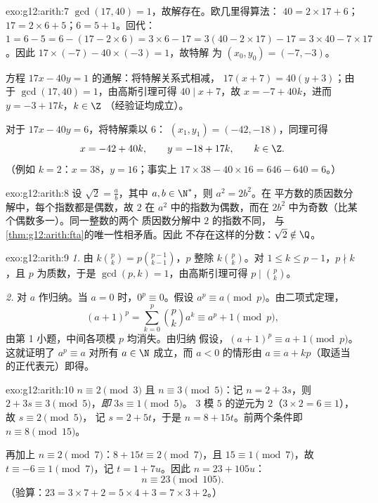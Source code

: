 \begin{solution}{exo:g12:arith:7}
$\gcd(17, 40) = 1$，故解存在。欧几里得算法：
$40 = 2\times17 + 6$；$17 = 2\times6 + 5$；$6 = 5 + 1$。回代：
$1 = 6 - 5 = 6 - (17 - 2\times6) = 3\times6 - 17
= 3(40 - 2\times17) - 17 = 3\times40 - 7\times17$。因此
$17\times(-7) - 40\times(-3) = 1$，故特解
为 $(x_0, y_0) = (-7, -3)$。

方程 $17x - 40y = 1$ 的通解：将特解关系式相减，
$17(x + 7) = 40(y + 3)$；由于 $\gcd(17, 40) = 1$，由高斯引理可得
$40 \mid x + 7$，故 $x = -7 + 40k$，进而 $y = -3 + 17k$，$k \in \Z$
（经验证均成立）。

对于 $17x - 40y = 6$，将特解乘以 $6$：
$(x_1, y_1) = (-42, -18)$，同理可得
\[
x = -42 + 40k, \qquad y = -18 + 17k, \qquad k \in \Z .
\]
（例如 $k = 2$：$x = 38$，$y = 16$；事实上 $17\times38 - 40\times16
= 646 - 640 = 6$。）
\end{solution}

\begin{solution}{exo:g12:arith:8}
设 $\sqrt2 = \frac ab$，其中 $a, b \in \N^*$，则 $a^2 = 2b^2$。在
平方数的质因数分解中，每个指数都是偶数，故
$2$ 在 $a^2$ 中的指数为偶数，而在 $2b^2$ 中为奇数（比某个偶数多一）。同一整数的两个
质因数分解中 $2$ 的指数不同，
与\cref{thm:g12:arith:fta}的唯一性相矛盾。因此
不存在这样的分数：$\sqrt2 \notin \Q$。
\end{solution}

\begin{solution}{exo:g12:arith:9}
\emph{1.} 由 $k\binom pk = p \binom{p-1}{k-1}$，$p$ 整除
$k\binom pk$。对 $1 \leq k \leq p-1$，$p \nmid k$，且 $p$ 为质数，于是
$\gcd(p, k) = 1$，由高斯引理可得 $p \mid \binom pk$。

\emph{2.} 对 $a$ 作归纳。当 $a = 0$ 时，$0^p \equiv 0$。假设
$a^p \equiv a \pmod p$。由二项式定理，
\[
(a+1)^p = \sum_{k=0}^{p} \binom pk a^k
\equiv a^p + 1 \pmod p,
\]
由第 1 小题，中间各项模 $p$ 均消失。由归纳
假设，$(a+1)^p \equiv a + 1 \pmod p$。这就证明了
$a^p \equiv a$ 对所有 $a \in \N$ 成立，而 $a < 0$ 的情形由
$a \equiv a + kp$（取适当的正代表元）即得。
\end{solution}

\begin{solution}{exo:g12:arith:10}
$n \equiv 2 \pmod 3$ 且 $n \equiv 3 \pmod 5$：记 $n = 2 + 3s$，则
$2 + 3s \equiv 3 \pmod 5$，\emph{即} $3s \equiv 1 \pmod 5$。
$3$ 模 $5$ 的逆元为 $2$（$3\times2 = 6 \equiv 1$），故 $s \equiv 2 \pmod 5$，
记 $s = 2 + 5t$，于是 $n = 8 + 15t$。前两个条件即
$n \equiv 8 \pmod{15}$。

再加上 $n \equiv 2 \pmod 7$：$8 + 15t \equiv 2 \pmod 7$，且
$15 \equiv 1 \pmod 7$，故 $t \equiv -6 \equiv 1 \pmod 7$，记
$t = 1 + 7u$。因此 $n = 23 + 105u$：
\[
n \equiv 23 \pmod{105}.
\]
（验算：$23 = 3\times7 + 2 = 5\times4 + 3 = 7\times3 + 2$。）
\end{solution}

